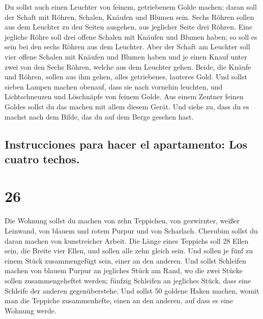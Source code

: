  Du sollst auch einen Leuchter von feinem, getriebenem
Golde machen; daran soll der Schaft mit Röhren, Schalen, Knäufen und
Blumen sein.  Sechs Röhren sollen aus dem Leuchter zu den
Seiten ausgehen, aus jeglicher Seite drei Röhren.  Eine
jegliche Röhre soll drei offene Schalen mit Knäufen und Blumen haben; so
soll es sein bei den sechs Röhren aus dem Leuchter.  Aber
der Schaft am Leuchter soll vier offene Schalen mit Knäufen und Blumen
haben  und je einen Knauf unter zwei von den Sechs
Röhren, welche aus dem Leuchter gehen.  Beide, die Knäufe
und Röhren, sollen aus ihm gehen, alles getriebenes, lauteres Gold.
 Und sollst sieben Lampen machen obenauf, dass sie nach
vornehin leuchten,  und Lichtschneuzen und Löschnäpfe von
feinem Golde.  Aus einem Zentner feinen Goldes sollst du
das machen mit allem diesem Gerät.  Und siehe zu, dass du
es machst nach dem Bilde, das du auf dem Berge gesehen hast.

\hypertarget{instrucciones-para-hacer-el-apartamento-los-cuatro-techos.}{%
\subsection{Instrucciones para hacer el apartamento: Los cuatro
techos.}\label{instrucciones-para-hacer-el-apartamento-los-cuatro-techos.}}

\hypertarget{section-25}{%
\section{26}\label{section-25}}

 Die Wohnung sollst du machen von zehn Teppichen, von
gezwirnter, weißer Leinwand, von blauem und rotem Purpur und von
Scharlach. Cherubim sollst du daran machen von kunstreicher Arbeit.
 Die Länge eines Teppichs soll 28 Ellen sein, die Breite
vier Ellen, und sollen alle zehn gleich sein.  Und sollen
je fünf zu einem Stück zusammengefügt sein, einer an den anderen.
 Und sollst Schleifen machen von blauem Purpur an
jegliches Stück am Rand, wo die zwei Stücke sollen zusammengeheftet
werden;  fünfzig Schleifen an jegliches Stück, dass eine
Schleife der anderen gegenüberstehe.  Und sollst 50
goldene Haken machen, womit man die Teppiche zusammenhefte, einen an den
anderen, auf dass es eine Wohnung werde.

